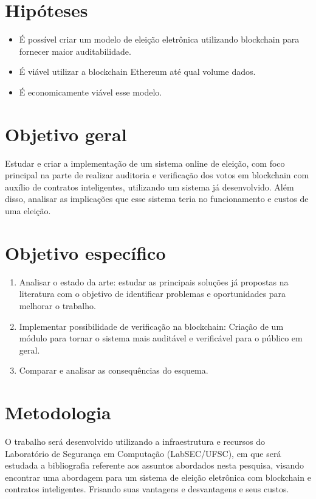 \documentclass{ufsctex/ufsctex}
\begin{document}
\section{Hipóteses}

\begin{itemize}
	\item É possível criar um modelo de eleição eletrônica utilizando blockchain
		para fornecer maior auditabilidade.
	\item É viável utilizar a blockchain Ethereum até qual volume dados.
	\item É economicamente viável esse modelo.
\end{itemize}

\section{Objetivo geral}

Estudar e criar a implementação de um sistema online de eleição, com foco
principal na parte de realizar auditoria e verificação dos votos em blockchain
com auxílio de contratos inteligentes, utilizando um sistema já desenvolvido.
Além disso, analisar as implicações que esse sistema teria no funcionamento e
custos de uma eleição. \\

\section{Objetivo específico}

\begin{enumerate}[label=\roman*.]
	\item Analisar o estado da arte: estudar as principais soluções
	já propostas na literatura com o objetivo de identificar problemas
	e oportunidades para melhorar o trabalho.
	\item Implementar possibilidade de verificação na blockchain:
	Criação de  um módulo para tornar o sistema mais auditável e 
	verificável para o público em geral.
	\item Comparar e analisar as consequências do esquema.
\end{enumerate}

\section{Metodologia}

O trabalho será desenvolvido utilizando a infraestrutura e recursos do
Laboratório de Segurança em Computação (LabSEC/UFSC), em que será estudada a
bibliografia referente aos assuntos abordados nesta pesquisa, visando encontrar
uma abordagem para um sistema de eleição eletrônica com blockchain e contratos
inteligentes.  Frisando suas vantagens e desvantagens e seus custos.
\end{document}
